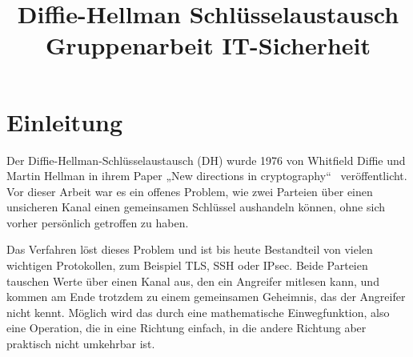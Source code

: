 \documentclass[conference]{IEEEtran}
\begin{document}
\title{Diffie-Hellman Schlüsselaustausch\\
{\footnotesize Gruppenarbeit IT-Sicherheit}}

\author{
\and
{}
\and
{}
\and
{}
\and
}

\maketitle



\section{Einleitung}

Der Diffie-Hellman-Schlüsselaustausch (DH) wurde 1976 von Whitfield
Diffie und Martin Hellman in ihrem Paper „New directions in
cryptography``~\cite{dh1976} veröffentlicht. Vor dieser Arbeit war
es ein offenes Problem, wie zwei Parteien über einen unsicheren Kanal
einen gemeinsamen Schlüssel aushandeln können, ohne sich vorher
persönlich getroffen zu haben.

Das Verfahren löst dieses Problem und ist bis heute Bestandteil von
vielen wichtigen Protokollen, zum Beispiel TLS, SSH oder IPsec. Beide
Parteien tauschen Werte über
einen Kanal aus, den ein Angreifer mitlesen kann, und kommen am Ende
trotzdem zu einem gemeinsamen Geheimnis, das der Angreifer nicht
kennt. Möglich wird das durch eine mathematische Einwegfunktion, also
eine Operation, die in eine Richtung einfach, in die andere Richtung
aber praktisch nicht umkehrbar ist.
\end{document}
